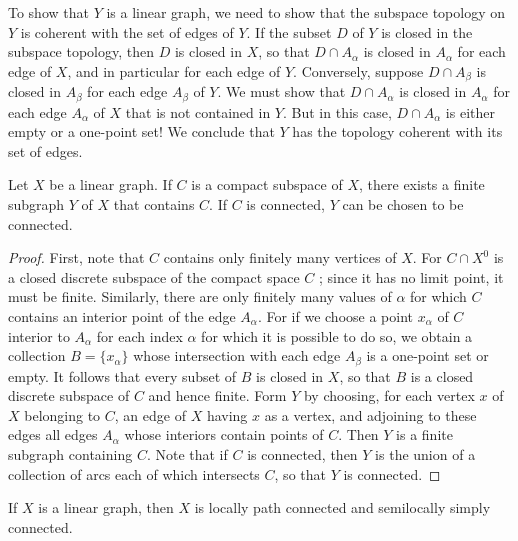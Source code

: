 To show that \(Y\) is a linear graph, we need to show that the subspace topology on \(Y\) is coherent with the set of edges of \(Y\). If the subset \(D\) of \(Y\) is closed in the subspace topology, then \(D\) is closed in \(X\), so that \(D \cap {A}_{\alpha }\) is closed in \(A_{\alpha }\) for each edge of \(X\), and in particular for each edge of \(Y\). Conversely, suppose \(D \cap {A}_{\beta }\) is closed in \(A_{\beta }\) for each edge \(A_{\beta }\) of \(Y\). We must show that \(D \cap {A}_{\alpha }\) is closed in \(A_{\alpha }\) for each edge \(A_{\alpha }\) of \(X\) that is not contained in \(Y\). But in this case, \(D \cap {A}_{\alpha }\) is either empty or a one-point set! We conclude that \(Y\) has the topology coherent with its set of edges.

\begin{lemma}
\label{lem:\thetheorem}
	Let \(X\) be a linear graph. If \(C\) is a compact subspace of \(X\), there exists a finite subgraph \(Y\) of \(X\) that contains \(C\). If \(C\) is connected, \(Y\) can be chosen to be connected.
\end{lemma}

\begin{proof}
	First, note that \(C\) contains only finitely many vertices of \(X\). For \(C \cap {X}^{0}\) is a closed discrete subspace of the compact space \(C\) ; since it has no limit point, it must be finite. Similarly, there are only finitely many values of \(\alpha\) for which \(C\) contains an interior point of the edge \(A_{\alpha }\). For if we choose a point \(x_{\alpha }\) of \(C\) interior to \(A_{\alpha }\) for each index \(\alpha\) for which it is possible to do so, we obtain a collection \(B = \{ x_{\alpha }\}\) whose intersection with each edge \(A_{\beta }\) is a one-point set or empty. It follows that every subset of \(B\) is closed in \(X\), so that \(B\) is a closed discrete subspace of \(C\) and hence finite.
Form \(Y\) by choosing, for each vertex \(x\) of \(X\) belonging to \(C\), an edge of \(X\) having \(x\) as a vertex, and adjoining to these edges all edges \(A_{\alpha }\) whose interiors contain points of \(C\). Then \(Y\) is a finite subgraph containing \(C\). Note that if \(C\) is connected, then \(Y\) is the union of a collection of arcs each of which intersects \(C\), so that \(Y\) is connected.
\end{proof}
\begin{lemma}
\label{lem:\thetheorem}
	If \(X\) is a linear graph, then \(X\) is locally path connected and semilocally simply connected.
\end{lemma}

